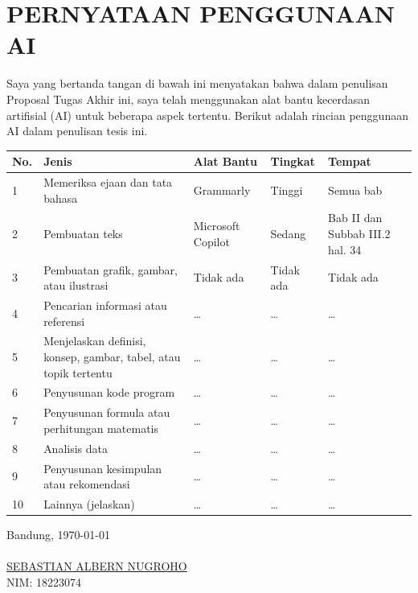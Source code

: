 \chapter*{PERNYATAAN PENGGUNAAN AI}
Saya yang bertanda tangan di bawah ini menyatakan bahwa dalam penulisan Proposal Tugas Akhir ini, saya telah menggunakan alat bantu kecerdasan artifisial (AI) untuk beberapa aspek tertentu. Berikut adalah rincian penggunaan AI dalam penulisan tesis ini.
\begin{table}[h]
\begin{tabular}{|p{0.5cm}| p{4cm} | p{2.5cm} | p{2.5cm} | p{3cm} @{}| }
\hline
\textbf{No.} & \textbf{Jenis} & \textbf{Alat Bantu} & \textbf{Tingkat} & \textbf{Tempat}\\
\hline
1 & Memeriksa ejaan dan tata bahasa & Grammarly & Tinggi & Semua bab \\
\hline
2 & Pembuatan teks & Microsoft Copilot & Sedang & Bab II dan Subbab III.2 hal. 34 \\
\hline
3 & Pembuatan grafik, gambar, atau ilustrasi & Tidak ada & Tidak ada & Tidak ada \\
\hline
4 & Pencarian informasi atau referensi & \ldots & \ldots & \ldots \\
\hline
5 & Menjelaskan definisi, konsep, gambar, tabel, atau topik tertentu  & \ldots & \ldots & \ldots \\
\hline
6 & Penyusunan kode program & \ldots & \ldots & \ldots \\
\hline
7 & Penyusunan formula atau perhitungan matematis & \ldots & \ldots & \ldots \\
\hline
8 &  Analisis data  & \ldots & \ldots & \ldots \\
\hline
9 & Penyusunan kesimpulan atau rekomendasi & \ldots & \ldots & \ldots \\
\hline
10 & Lainnya (jelaskan) & \ldots & \ldots & \ldots \\
\hline
\end{tabular}
\end{table}


Bandung, \today\\
\\[2cm]

\underline{SEBASTIAN ALBERN NUGROHO} \\
NIM: 18223074
